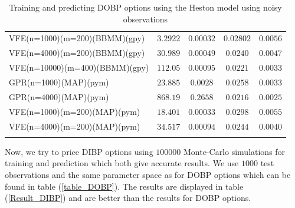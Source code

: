 \documentclass[12pt,a4paper,oneside]{book}
\begin{document}
\begin{table}
\begin{tabular}[t]{lcccc}
VFE(n=1000)(m=200)(BBMM)(gpy)  & $3.2922$ & $0.00032$     & $0.02802$ &    $0.0056$ \\\addlinespace
VFE(n=4000)(m=200)(BBMM)(gpy)  & $30.989$ & $ 0.00049$    & $0.0240$ &    $0.0047$ \\\addlinespace
VFE(n=10000)(m=400)(BBMM)(gpy)  & $112.05$ &  $0.00095$  & $0.0221$ & $0.0033$  \\\addlinespace
GPR(n=1000)(MAP)(pym)  & $23.885$  &  $0.0028$   & $0.0258$ & $0.0033$  \\\addlinespace
GPR(n=4000)(MAP)(pym)  & $868.19$ & $0.2658$    & $0.0216$ & $0.0025$   \\\addlinespace
VFE(n=1000)(m=200)(MAP)(pym)  & $18.401$ & $0.00033$    & $0.0298$  &   $ 0.0055$ \\\addlinespace
VFE(n=4000)(m=200)(MAP)(pym)  & $34.517$ &  $0.00094$   & $0.0244$ &     $0.0040$ \\\addlinespace
\\\bottomrule
\end{tabular}
\caption{Training and predicting DOBP options using the Heston model using noisy observations}\label{dobp_outcomes}
\end{table}

\fi

Now, we try to price DIBP options using $100 000$ Monte-Carlo simulations for training and prediction which both give accurate results. We use $1000$ test observations and the same parameter space as for DOBP options which can be found in table (\ref{table_DOBP}). The results are displayed in table (\ref{Result_DIBP}) and are better than the results for DOBP options. 
\end{document}
